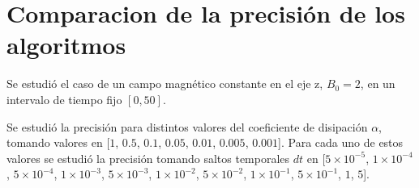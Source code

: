 \documentclass[a4paper, 11pt, spanish]{article}
\begin{document}
\vspace*{0.5cm}
\section{Comparacion de la precisión de los algoritmos}
Se estudió el caso de un campo magnético constante en el eje z, $B_0 = 2$, en un intervalo de tiempo fijo $[0, 50]$.

Se estudió la precisión para distintos valores del coeficiente de disipación $\alpha$, tomando valores en [$1$, $0.5$, $0.1$, $0.05$, $0.01$, $0.005$, $0.001$]. Para cada uno de estos valores se estudió la precisión tomando saltos temporales $dt$ en [$5\times 10^{-5}$, $1\times 10^{-4}$, $5\times 10^{-4}$, $1\times 10^{-3}$, $5\times 10^{-3}$, $1\times 10^{-2}$, $5\times 10^{-2}$, $1\times 10^{-1}$, $5\times 10^{-1}$, $1$, $5$].
\end{document}
